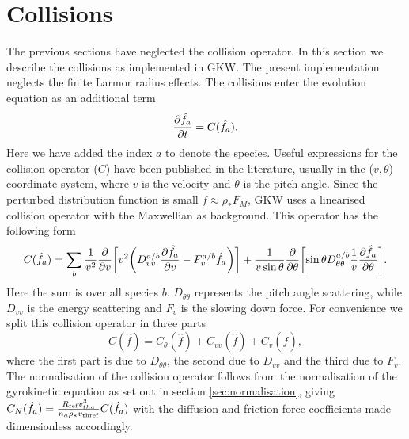 \chapter{Collisions} 

The previous sections have neglected the collision operator. 
In this section we describe the collisions as implemented in GKW.  The present implementation neglects the 
finite Larmor radius effects. 
The collisions enter the evolution equation as an additional term 
\begin{equation} 
{\partial \hat{f_a} \over \partial t} = C(\hat{f_a}) .
\end{equation} 
Here we have added the index $a$ to denote the species. 
Useful expressions for the collision operator ($C$) have been published in the literature, usually in the 
($v,\theta$) coordinate system, where $v$ is the velocity and $\theta$ is the pitch angle.
Since the perturbed distribution function is small $f \approx \rho_* F_M$, GKW uses a linearised 
collision operator with the Maxwellian as background. 
This operator has the following form \cite{KAR86} 
\begin{equation} 
C(\hat f_a) = \sum_b {1\over v^2} {\partial \over \partial v} \biggl [ v^2 \biggl ( 
D_{vv}^{a/b} {\partial \hat{f_a} \over \partial v} - F_v^{a/b}\hat{f_a} \biggr ) \biggr ] + {1 \over v 
\sin \theta } {\partial \over \partial \theta} \biggl [ \sin \theta  D_{\theta \theta}^{a/b} 
{1\over v}{\partial \hat{f_a} \over \partial \theta} \biggr ] .
\end{equation} 
Here the sum is over all species $b$. 
$D_{\theta \theta}$ represents the pitch angle scattering, while $D_{vv}$ is the energy scattering
and $F_v$ is the slowing down force. For convenience we split this collision 
operator in three parts 
\begin{equation} 
C(\hat{f}) = C_\theta(\hat{f}) + C_{vv}(\hat{f}) + C_v(\hat{f}),
\end{equation}
where the first part is due to $D_{\theta \theta}$, the second due to $D_{vv}$ and the third 
due to $F_v$. The normalisation of the collision operator follows from the normalisation of the 
gyrokinetic equation as set out in section \ref{sec:normalisation}, giving 
$C_N(\hat{f}_a) = {R_{\rm ref} v_{tha}^3 \over n_a \rho_* v_{\rm thref}} C(\hat{f}_a)$ with the diffusion 
and friction force coefficients made dimensionless accordingly.  

